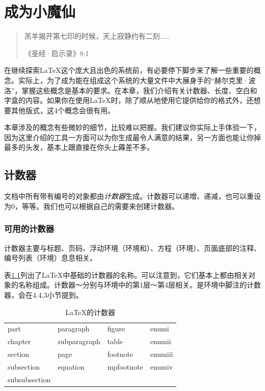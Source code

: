 \chapter{成为小魔仙}

\begin{quote}
    羔羊揭开第七印的时候，天上寂静约有二刻……
    
    \hfill《圣经·启示录》8:1
\end{quote}

在继续探索\LaTeX 这个庞大且出色的系统前，有必要停下脚步来了解一些重要的概念。实际上，为了成为能在组成这个系统的大量文件中大展身手的“赫尔克里·波洛”，掌握这些概念是基本的要求。在本章，我们介绍有关计数器、长度、空白和字盒的内容。如果你在使用\LaTeX 时，除了顺从地使用它提供给你的格式外，还想要其他版式，这4个概念会很有用。

\begin{exclamation}
    本章涉及的概念有些微妙的细节，比较难以把握。我们建议你实际上手体验一下，因为这里介绍的工具一方面可以为你生成最令人满意的结果，另一方面也能让你掉最多的头发，基本上跟直接在你头上薅差不多。
\end{exclamation}
\section{计数器}

文档中所有带有编号的对象都由\emph{计数器}生成。计数器可以递增、递减，也可以重设为0，等等。我们也可以根据自己的需要来创建计数器。

\subsection{可用的计数器}

计数器主要与标题、页码、浮动环境（环境和）、方程（环境）、页面底部的注释、编号列表（环境）息息相关。

表\ref{tab:4.1}列出了\LaTeX 中基础的计数器的名称。可以注意到，它们基本上都由相关对象的名称组成。计数器～分别与环境中的第1层～第4层相关。是环境中脚注的计数器，会在4.4.3小节提到。

\begin{table}
  \centering
  \ttfamily
  \begin{tabular}{|l|l|l|l|}
    \hline
    part       & paragraph    & figure     & enumi\\
    chapter    & subparagraph & table      & enumii\\
    section    & page         & footnote   & enumiii\\
    subsection & equation     & mpfootnote & enumiv\\
    subsubsection &&&\\
    \hline
  \end{tabular}
  \caption{\LaTeX 的计数器}
  \label{tab:4.1}
\end{table}

